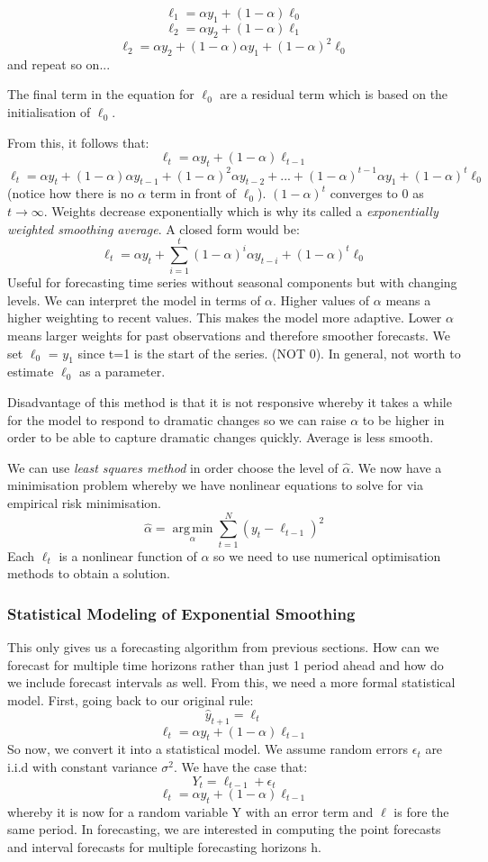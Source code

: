 \documentclass[11pt, oneside]{article}
\theoremstyle{definition}
\DeclareMathOperator*{\argmin}{arg\,min}
\begin{document}
$$
\ell_1 = \alpha y_1 + (1-\alpha)\ell_0
$$
$$
\ell_2 = \alpha y_2 + (1-\alpha)\ell_1
$$
$$
\ell_2 = \alpha y_2 + (1-\alpha)\alpha y_1 + (1-\alpha)^2\ell_0
$$
and repeat so on...

The final term in the equation for $\ell_0$ are a residual term which is based on the initialisation of $\ell_0$.

From this, it follows that:
$$
\ell_t = \alpha y_t + (1-\alpha)\ell_{t-1}
$$
$$
\ell_t = \alpha y_t + (1-\alpha)\alpha y_{t-1} + (1-\alpha)^2\alpha y_{t-2} + ... + (1-\alpha)^{t-1}\alpha y_1 + (1-\alpha)^t\ell_0
$$
(notice how there is no $\alpha$ term in front of $\ell_0$). $(1-\alpha)^t$ converges to 0 as $t \rightarrow \infty$. Weights decrease exponentially which is why its called a \textit{exponentially weighted smoothing average}. A closed form would be:
$$
\ell_t = \alpha y_t + \sum\limits_{i=1}^{t}(1 - \alpha)^{i}\alpha y_{t-i} + (1 - \alpha)^{t}\ell_0
$$
Useful for forecasting time series without seasonal components but with changing levels. We can interpret the model in terms of $\alpha$. Higher values of $\alpha$ means a higher weighting to recent values. This makes the model more adaptive. Lower $\alpha$ means larger weights for past observations and therefore smoother forecasts. We set $\ell_0$ = $y_1$ since t=1 is the start of the series. (NOT 0). In general, not worth to estimate $\ell_0$ as a parameter.

Disadvantage of this method is that it is not responsive whereby it takes a while for the model to respond to dramatic changes so we can raise $\alpha$ to be higher in order to be able to capture dramatic changes quickly. Average is less smooth.

We can use \textit{least squares method} in order choose the level of $\hat{\alpha}$. We now have a minimisation problem whereby we have nonlinear equations to solve for via empirical risk minimisation.
$$
\hat{\alpha} = \argmin\limits_{\alpha}\sum\limits_{t=1}^N(y_t - \ell_{t-1})^2
$$
Each $\ell_t$ is a nonlinear function of $\alpha$ so we need to use numerical optimisation methods to obtain a solution.

\subsubsection{Statistical Modeling of Exponential Smoothing}
This only gives us a forecasting algorithm from previous sections. How can we forecast for multiple time horizons rather than just 1 period ahead and how do we include forecast intervals as well. From this, we need a more formal statistical model. First, going back to our original rule:
$$
\hat{y}_{t+1} = \ell_t
$$
$$
\ell_t = \alpha y_t + (1 - \alpha)\ell_{t-1}
$$
So now, we convert it into a statistical model. We assume random errors $\epsilon_t$ are i.i.d with constant variance $\sigma^2$. We have the case that:
$$
Y_t = \ell_{t-1} + \epsilon_t
$$
$$
\ell_t = \alpha y_t + (1-\alpha)\ell_{t-1}
$$
whereby it is now for a random variable Y with an error term and $\ell$ is fore the same period. In forecasting, we are interested in computing the point forecasts and interval forecasts for multiple forecasting horizons h.
\end{document}
